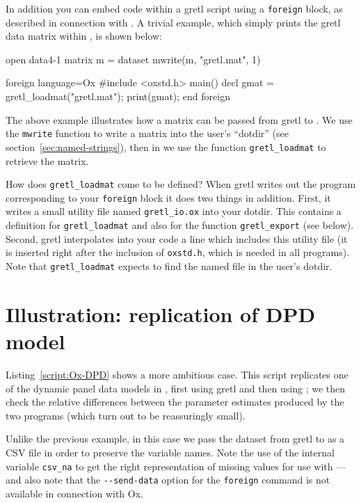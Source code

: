 In addition you can embed  code within a gretl script
using a \texttt{foreign} block, as described in connection with
.  A trivial example, which simply prints the gretl data
matrix within , is shown below:
%
\begin{code}
open data4-1
matrix m = {dataset}
mwrite(m, "gretl.mat", 1)

foreign language=Ox 
#include <oxstd.h>
main()
{
   decl gmat = gretl_loadmat("gretl.mat");
   print(gmat);
}
end foreign
\end{code}

The above example illustrates how a matrix can be passed from
gretl to .  We use the \texttt{mwrite} function to write
a matrix into the user's ``dotdir'' (see
section~\ref{sec:named-strings}), then in  we use the function
\verb|gretl_loadmat| to retrieve the matrix.

How does \verb|gretl_loadmat| come to be defined?  When gretl
writes out the  program corresponding to your \texttt{foreign}
block it does two things in addition.  First, it writes a small
utility file named \verb|gretl_io.ox| into your dotdir.  This contains
a definition for \verb|gretl_loadmat| and also for the function
\verb|gretl_export| (see below).  Second, gretl interpolates
into your  code a line which includes this utility file (it is
inserted right after the inclusion of \texttt{oxstd.h}, which is
needed in all  programs).  Note that \verb|gretl_loadmat|
expects to find the named file in the user's dotdir.

\section{Illustration: replication of DPD model}
\label{sec:dpd-replication}

Listing~\ref{script:Ox-DPD} shows a more ambitious case.  This script
replicates one of the dynamic panel data models in
\cite{arellano-bond91}, first using gretl and then using ; we
then check the relative differences between the parameter estimates
produced by the two programs (which turn out to be reassuringly
small).

Unlike the previous example, in this case we pass the dataset from
gretl to  as a CSV file in order to preserve the
variable names.  Note the use of the internal variable \verb|csv_na|
to get the right representation of missing values for use with
---and also note that the \verb|--send-data| option for the
\texttt{foreign} command is not available in connection with Ox.


